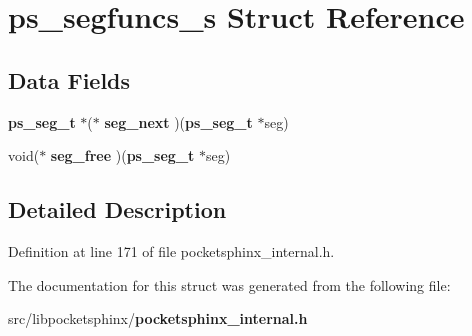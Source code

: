 \section{ps\-\_\-segfuncs\-\_\-s Struct Reference}
\label{structps__segfuncs__s}
\subsection*{Data Fields}
\begin{DoxyCompactItemize}
\item 
{\bf ps\-\_\-seg\-\_\-t} $\ast$($\ast$ {\bfseries seg\-\_\-next} )({\bf ps\-\_\-seg\-\_\-t} $\ast$seg)\label{structps__segfuncs__s_a8d9d7ccdb757620830d352d5fece4119}

\item 
void($\ast$ {\bfseries seg\-\_\-free} )({\bf ps\-\_\-seg\-\_\-t} $\ast$seg)\label{structps__segfuncs__s_abbc6c03c53212c4b973f3a0e4121e2ba}

\end{DoxyCompactItemize}


\subsection{Detailed Description}


Definition at line 171 of file pocketsphinx\-\_\-internal.\-h.



The documentation for this struct was generated from the following file\-:\begin{DoxyCompactItemize}
\item 
src/libpocketsphinx/{\bf pocketsphinx\-\_\-internal.\-h}\end{DoxyCompactItemize}
